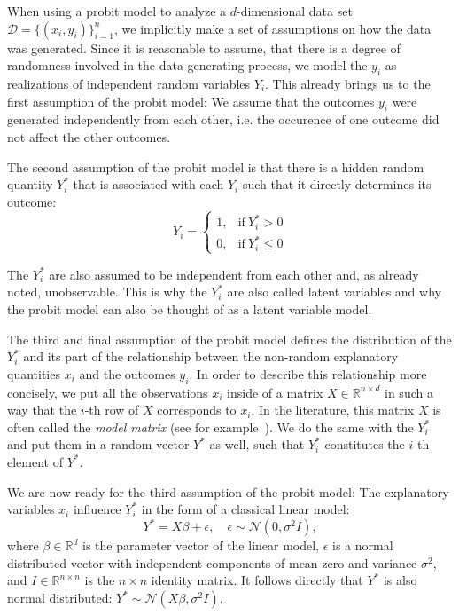 When using a probit model to analyze a $d$-dimensional data set
$\mathcal{D} = \{(x_i, y_i)\}_{i=1}^n$, we implicitly
make a set of assumptions on how the data was generated.
Since it is reasonable to assume, that there is a degree of randomness
involved in the data generating process, we model the $y_i$ as realizations
of independent random variables $Y_i$.
This already brings us to the first assumption of the probit model:
We assume that the outcomes $y_i$ were generated independently
from each other, i.e. the occurence of one outcome did not affect
the other outcomes.

The second assumption of the probit model is that there is
a hidden random quantity
$Y_i^\ast$ that is associated with each $Y_i$ such that it
directly determines its outcome:
\begin{equation}
    Y_i =
    \begin{cases}
        1, & \text{if}\ Y_i^\ast > 0    \\
        0, & \text{if}\ Y_i^\ast \leq 0
    \end{cases}
\end{equation}

\noindent The $Y_i^\ast$ are also assumed to be independent from each
other and, as already noted, unobservable.
This is why the $Y_i^\ast$ are also called latent variables and
why the probit model can also be thought of as a latent variable model.

The third and final assumption of the probit model defines the
distribution of the $Y_i^\ast$ and its part of the relationship
between the non-random explanatory quantities $x_i$ and the outcomes $y_i$.
In order to describe this relationship more concisely,
we put all the observations $x_i$ inside of a
matrix $X \in \mathbb{R}^{n \times d}$ in such a way that
the $i$-th row of $X$ corresponds to $x_i$.
In the literature, this matrix $X$ is often called the \textit{model matrix}
(see for example~\cite{glm-agresti}).
We do the same with the $Y_i^\ast$ and put them in a
random vector $Y^\ast$ as well, such that $Y_i^\ast$ constitutes
the $i$-th element of $Y^\ast$.

We are now ready for the third assumption of the probit model:
The explanatory variables
$x_i$ influence $Y_i^\ast$ in the form of a classical linear model:
\begin{equation}
    Y^\ast = X \beta + \epsilon, \quad \epsilon \sim \mathcal{N}(0, \sigma^2 I),
\end{equation}
where $\beta \in \mathbb{R}^d$ is the parameter vector of the linear model,
$\epsilon$ is a normal distributed vector with independent components of
mean zero and variance $\sigma^2$,
and
$I \in \mathbb{R}^{n \times n}$ is the $n \times n$ identity matrix.
It follows directly that $Y^\ast$ is also normal distributed:
$Y^\ast \sim \mathcal{N}(X \beta, \sigma^2 I)$.

